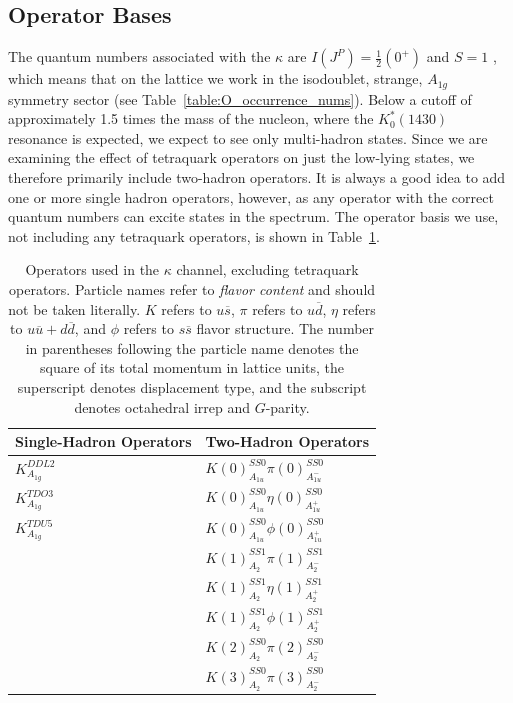 \subsection{Operator Bases}
The quantum numbers associated with the $\kappa$ are $I(J^{P})=\frac{1}{2}(0^+)$ and $S=1$ , which means that on the lattice we work in the isodoublet, strange, $A_{1g}$ symmetry sector (see Table~\ref{table:O_occurrence_nums}). Below a cutoff of approximately 1.5 times the mass of the nucleon, where the $K_0^*(1430)$ resonance is expected, we expect to see only multi-hadron states. Since we are examining the effect of tetraquark operators on just the low-lying states, we therefore primarily include two-hadron operators. It is always a good idea to add one or more single hadron operators, however, as any operator with the correct quantum numbers can excite states in the spectrum. The operator basis we use, not including any tetraquark operators, is shown in Table~\ref{table:kappa_ops_no_tq}.
\begin{table}
  \centering
  \begin{tabular}{l|l}
    \textbf{Single-Hadron Operators} & \textbf{Two-Hadron Operators}\\
    \hline
    $K_{A_{1g}}^{DDL2}$ & $K(0)_{A_{1u}}^{SS0}\pi(0)_{A_{1u}^-}^{SS0}$\\
    $K_{A_{1g}}^{TDO3}$ & $K(0)_{A_{1u}}^{SS0}\eta(0)_{A_{1u}^+}^{SS0}$\\
    $K_{A_{1g}}^{TDU5}$ & $K(0)_{A_{1u}}^{SS0}\phi(0)_{A_{1u}^+}^{SS0}$\\
    & $K(1)_{A_2}^{SS1}\pi(1)_{A_2^-}^{SS1}$\\
    & $K(1)_{A_2}^{SS1}\eta(1)_{A_2^+}^{SS1}$\\
    & $K(1)_{A_2}^{SS1}\phi(1)_{A_2^+}^{SS1}$\\
    & $K(2)_{A_2}^{SS0}\pi(2)_{A_2^-}^{SS0}$\\
    & $K(3)_{A_2}^{SS0}\pi(3)_{A_2^-}^{SS0}$
  \end{tabular}
  \caption[Operators used in the $\kappa$ channel, excluding tetraquark operators.]{Operators used in the $\kappa$ channel, excluding tetraquark operators. Particle names refer to \emph{flavor content} and should not be taken literally. $K$ refers to $u\overline s$, $\pi$ refers to $u\overline d$, $\eta$ refers to $u\overline u + d\overline d$, and $\phi$ refers to $s\overline s$ flavor structure. The number in parentheses following the particle name denotes the square of its total momentum in lattice units, the superscript denotes displacement type, and the subscript denotes octahedral irrep and $G$-parity.}
  \label{table:kappa_ops_no_tq}
\end{table}

